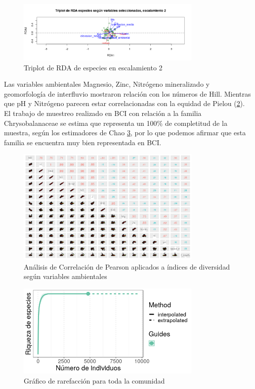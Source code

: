 \documentclass[11pt,]{article}
\begin{document}
\begin{figure}
\centering
\includegraphics[width=0.80000\textwidth]{triplotRDA.png}
\caption{Triplot de RDA de especies en escalamiento 2\label{triplotrda}}
\end{figure}

Las variables ambientales Magnesio, Zinc, Nitrógeno mineralizado y
geomorfología de interfluvio mostraron relación con los números de Hill.
Mientras que pH y Nitrógeno parecen estar correlacionadas con la equidad
de Pielou (\ref{diversidadalpha}). El trabajo de muestreo realizado en
BCI con relación a la familia Chrysobalanaceae se estima que representa
un 100\% de completitud de la muestra, según los estimadores de Chao
\ref{extrapolacion}, por lo que podemos afirmar que esta familia se
encuentra muy bien representada en BCI.

\begin{figure}
\centering
\includegraphics[width=0.80000\textwidth]{diversidadalpha.png}
\caption{Análisis de Correlación de Pearson aplicados a índices de
diversidad según variables ambientales\label{diversidadalpha}}
\end{figure}

\begin{figure}
\centering
\includegraphics[width=0.80000\textwidth]{Extrapolacion_mifamilia.png}
\caption{Gráfico de rarefacción para toda la
comunidad\label{extrapolacion}}
\end{figure}
\end{document}
